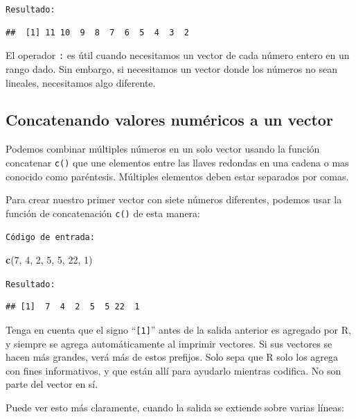 \documentclass[
]{book}
\newenvironment{Shaded}{\begin{snugshade}}{\end{snugshade}}
\newcommand{\DecValTok}[1]{\textcolor[rgb]{0.00,0.00,0.81}{#1}}
\newcommand{\KeywordTok}[1]{\textcolor[rgb]{0.13,0.29,0.53}{\textbf{#1}}}
\newcommand{\NormalTok}[1]{#1}
\begin{document}
\texttt{Resultado:}

\begin{verbatim}
##  [1] 11 10  9  8  7  6  5  4  3  2
\end{verbatim}

El operador \texttt{:} es útil cuando necesitamos un vector de cada número entero en un rango dado. Sin embargo, si necesitamos un vector donde los números no sean lineales, necesitamos algo diferente.

\hypertarget{concatenando-valores-numuxe9ricos-a-un-vector}{%
\subsection{Concatenando valores numéricos a un vector}\label{concatenando-valores-numuxe9ricos-a-un-vector}}

Podemos combinar múltiples números en un solo vector usando la función concatenar \texttt{c()} que une elementos entre las llaves redondas en una cadena o mas conocido como paréntesis. Múltiples elementos deben estar separados por comas.

Para crear nuestro primer vector con siete números diferentes, podemos usar la función de concatenación \texttt{c()} de esta manera:

\texttt{Código\ de\ entrada:}

\begin{Shaded}
\begin{Highlighting}[]
\KeywordTok{c}\NormalTok{(}\DecValTok{7}\NormalTok{, }\DecValTok{4}\NormalTok{, }\DecValTok{2}\NormalTok{, }\DecValTok{5}\NormalTok{, }\DecValTok{5}\NormalTok{, }\DecValTok{22}\NormalTok{, }\DecValTok{1}\NormalTok{) }
\end{Highlighting}
\end{Shaded}

\texttt{Resultado:}

\begin{verbatim}
## [1]  7  4  2  5  5 22  1
\end{verbatim}

Tenga en cuenta que el signo ``\texttt{{[}1{]}}'' antes de la salida anterior es agregado por R, y siempre se agrega automáticamente al imprimir vectores. Si sus vectores se hacen más grandes, verá más de estos prefijos. Solo sepa que R solo los agrega con fines informativos, y que están allí para ayudarlo mientras codifica. No son parte del vector en sí.

Puede ver esto más claramente, cuando la salida se extiende sobre varias líneas:
\end{document}
